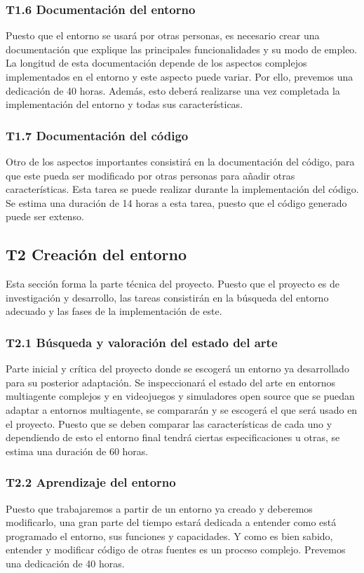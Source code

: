 \subsubsection*{T1.6 Documentación del entorno}
Puesto que el entorno se usará por otras personas, es necesario crear una documentación que explique las principales funcionalidades y su modo de empleo. La longitud de esta documentación depende de los aspectos complejos implementados en el entorno y este aspecto puede variar. Por ello, prevemos una dedicación de 40 horas. Además, esto deberá realizarse una vez completada la implementación del entorno y todas sus características.

\subsubsection*{T1.7 Documentación del código}
Otro de los aspectos importantes consistirá en la documentación del código, para que este pueda ser modificado por otras personas para añadir otras características. Esta tarea se puede realizar durante la implementación del código. Se estima una duración de 14 horas a esta tarea, puesto que el código generado puede ser extenso.

\subsection*{T2 Creación del entorno}

Esta sección forma la parte técnica del proyecto. Puesto que el proyecto es de investigación y desarrollo, las tareas consistirán en la búsqueda del entorno adecuado y las fases de la implementación de este.

\subsubsection*{T2.1 Búsqueda y valoración del estado del arte}
Parte inicial y crítica del proyecto donde se escogerá un entorno ya desarrollado para su posterior adaptación. Se inspeccionará el estado del arte en entornos multiagente complejos y en videojuegos y simuladores open source que se puedan adaptar a entornos multiagente, se compararán y se escogerá el que será usado en el proyecto. Puesto que se deben comparar las características de cada uno y dependiendo de esto el entorno final tendrá ciertas especificaciones u otras, se estima una duración de 60 horas.

\subsubsection*{T2.2 Aprendizaje del entorno}
Puesto que trabajaremos a partir de un entorno ya creado y deberemos modificarlo, una gran parte del tiempo estará dedicada a entender como está programado el entorno, sus funciones y capacidades. Y como es bien sabido, entender y modificar código de otras fuentes es un proceso complejo. Prevemos una dedicación de 40 horas.

